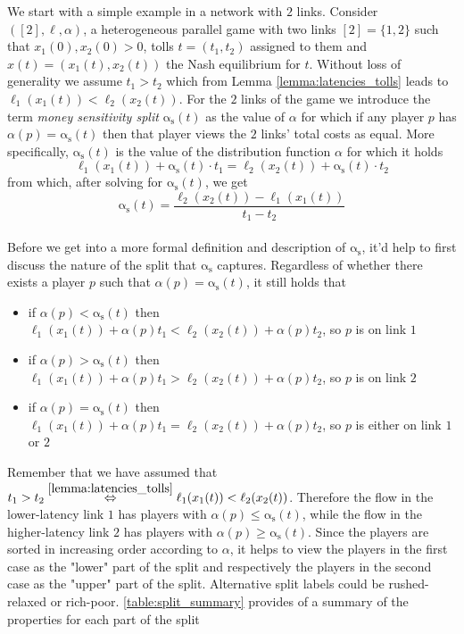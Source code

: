 \documentclass[10pt,a4paper]{book}
\newcommand{\as}{\mathrm{\alpha_s}}
\theoremstyle{definition}
\theoremstyle{comment}
\begin{document}
We start with a simple example in a network with $2$ links.
Consider $([2], \ell, \alpha)$, a heterogeneous parallel game with two links $[2] = \{1, 2\}$ such that $x_1(0), x_2(0) > 0$, tolls $t = (t_1, t_2)$ assigned to them and  $x(t) = (x_1(t), x_2(t))$ the Nash equilibrium for $t$.
Without loss of generality we assume $t_1 > t_2$ which from Lemma \ref{lemma:latencies_tolls} leads to $\ell_1(x_1(t)) < \ell_2(x_2(t))$.
For the $2$ links of the game we introduce the term \textit{money sensitivity split} $\as(t)$ as the value of $\alpha$ for which if any player $p$ has $\alpha(p)=\as(t)$ then that player views the $2$ links' total costs as equal.
More specifically, $\as(t)$ is the value of the distribution function $\alpha$ for which it holds
\[\ell_1(x_1(t)) + \as(t) \cdot t_1 = \ell_2(x_2(t)) + \as(t) \cdot t_2\]
from which, after solving for $\as(t)$, we get
\[\as(t) = \frac{\ell_2(x_2(t)) - \ell_1(x_1(t))}{t_1 - t_2}\]
\\
Before we get into a more formal definition and description of $\as$, it'd help to first discuss the nature of the split that $\as$ captures.
Regardless of whether there exists a player $p$ such that $\alpha(p) = \as(t)$, it still holds that
\begin{itemize}
	\item if $\alpha(p) < \as(t)$ then $\ell_1(x_1(t)) + \alpha(p) t_1 < \ell_2(x_2(t)) + \alpha(p) t_2$, so $p$ is on link $1$
	\item if $\alpha(p) > \as(t)$ then $\ell_1(x_1(t)) + \alpha(p) t_1 > \ell_2(x_2(t)) + \alpha(p) t_2$, so $p$ is on link $2$
	\item if $\alpha(p) = \as(t)$ then $\ell_1(x_1(t)) + \alpha(p) t_1 = \ell_2(x_2(t)) + \alpha(p) t_2$, so $p$ is either on link $1$ or $2$
\end{itemize}
Remember that we have assumed that $t_1 > t_2 \stackrel{\ref{lemma:latencies_tolls}}{\Leftrightarrow} \ell_1(x_1(t)) < \ell_2(x_2(t))$.
Therefore the flow in the lower-latency link $1$ has players with $\alpha(p) \le \as(t)$, while the flow in the higher-latency link $2$ has players with $\alpha(p) \ge \as(t)$.
Since the players are sorted in increasing order according to $\alpha$, it helps to view the players in the first case as the "lower" part of the split and respectively the players in the second case as the "upper" part of the split.
Alternative split labels could be rushed-relaxed or rich-poor.
\autoref{table:split_summary} provides of a summary of the properties for each part of the split
\end{document}
